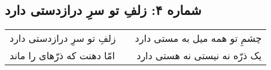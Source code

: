 \begin{center}
\section*{شماره ۴: زلفِ تو سرِ درازدستی دارد}
\label{sec:004}
\begin{longtable}{l p{0.5cm} r}
زلفِ تو سرِ درازدستی دارد
&&
چشمِ تو همه میل به مستی دارد
\\
امّا دهنت که ذرّهای را ماند
&&
یک ذرّه نه نیستی نه هستی دارد
\\
\end{longtable}
\end{center}
